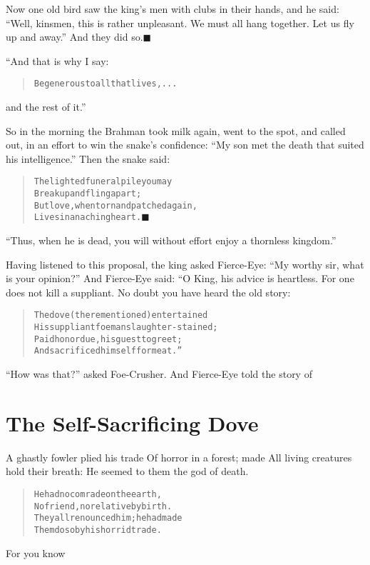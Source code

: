 \documentclass[article, twoside, 14pt]{memoir}
\newcommand{\qed}{\hfill \ensuremath{\blacksquare}}
\renewenvironment{verbatim}{%
\begin{quote}%
\vskip -10pt%
\begin{alltt}\normalfont\large}{\end{alltt}%
\end{quote}%
\vskip -10pt
} %
\begin{document}
Now one old bird saw the king's men with clubs in their hands, and
he said:
``Well, kinsmen, this is rather unpleasant. We must all hang together. Let us fly up and away.''
And they did so.\hyperref[s54]{\qed}

“And that is why I say:

\begin{verbatim}
Be generous to all that lives, . . .
\end{verbatim}
and the rest of it.”

So in the morning the Brahman took milk again, went to the spot,
and called out, in an effort to win the snake's confidence:
``My son met the death that suited his intelligence.'' Then the
snake said:

\begin{verbatim}
The lighted funeral pile you may
    Break up and fling apart;
But love, when torn and patched again,
    Lives in an aching heart.\hyperref[s53]{\qed}
\end{verbatim}
``Thus, when he is dead, you will without effort enjoy a thornless kingdom.''

Having listened to this proposal, the king asked Fierce-Eye:
``My worthy sir, what is your opinion?'' And Fierce-Eye said: “O
King, his advice is heartless. For one does not kill a suppliant.
No doubt you have heard the old story:

\begin{verbatim}
The dove (there mentioned) entertained
His suppliant foeman slaughter-stained;
Paid honor due, his guest to greet;
And sacrificed himself for meat.”
\end{verbatim}
``How was that?'' asked Foe-Crusher. And Fierce-Eye told the story
of

\chapter{The Self-Sacrificing Dove}

\label{s55} A ghastly fowler plied his trade Of horror in a forest;
made All living creatures hold their breath: He seemed to them the
god of death.

\begin{verbatim}
He had no comrade on the earth,
No friend, no relative by birth.
They all renounced him; he had made
Them do so by his horrid trade.
\end{verbatim}
For you know
\end{document}
